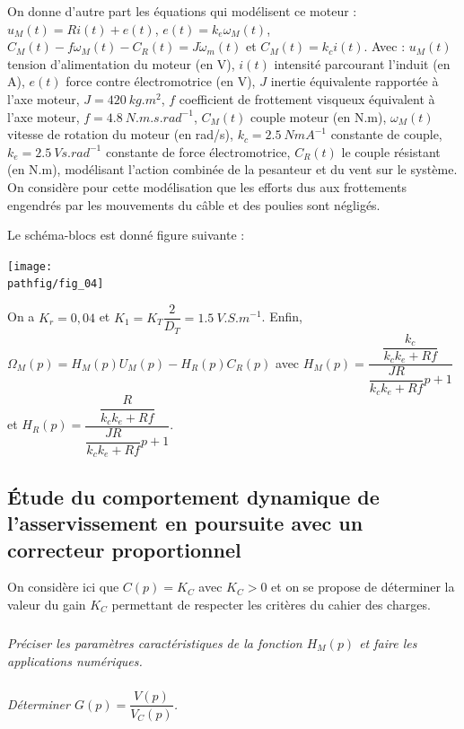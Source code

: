 \documentclass[10pt,fleqn]{article} %
\begin{document}


On donne d’autre part les équations qui modélisent ce moteur : $u_M(t)=R i(t) + e(t)$, 
$e(t) = k_e \omega_M(t)$, 
$C_M (t)-f\omega_M (t)-C_R (t)=J\dot{\omega}_m(t)$ et 
$C_M (t) = k_ c i(t)$. Avec : 
$u_M (t)$ tension d’alimentation du moteur (en V),  $i(t)$ intensité parcourant l’induit (en A), $e(t)$ force contre électromotrice (en V), $J$ inertie équivalente rapportée à l’axe moteur, $J = \SI{420}{kg.m^2}$, $f$ coefficient de frottement visqueux équivalent à l’axe moteur, $f = \SI{4,8}{N.m.s.rad^{-1}}$, $C_M (t)$ couple moteur (en N.m),  $\omega_M(t)$ vitesse de rotation du moteur (en rad/s), $k_c=\SI{2,5}{NmA^{-1}}$ constante de couple, $k_e=\SI{2,5}{Vs.rad^{-1}}$ constante de force électromotrice,  $C_R (t)$ le couple résistant (en N.m), modélisant l’action combinée de la pesanteur et du vent sur le système. On considère pour cette modélisation que les efforts dus aux frottements engendrés par les mouvements du câble et des poulies sont négligés.

Le schéma-blocs est donné figure suivante : 

\begin{center}
\texttt{[image: \\pathfig/fig\_04]}
\end{center}

On a $K_r = 0,04$ et $K_1=K_T\dfrac{2}{D_T}=\SI{1,5}{V.S.m^{-1}}$.
Enfin, $\Omega_M(p)=H_M(p)U_M(p)-H_R(p)C_R(p)$ avec $H_M(p)=\dfrac{\dfrac{k_c}{k_ck_e+Rf}}{\dfrac{JR}{k_ck_e+Rf}p+1}$ et $H_R(p)=\dfrac{\dfrac{R}{k_ck_e+Rf}}{\dfrac{JR}{k_ck_e+Rf}p+1}$.

\subsection*{Étude du comportement dynamique de l’asservissement en poursuite avec un correcteur proportionnel }
On considère ici que $C(p) = K_C$ avec $K_C > $0 et on se propose de déterminer la valeur du gain $K_C$ permettant de respecter les critères du cahier des charges. 

\subparagraph{}\textit{Préciser les paramètres caractéristiques de la fonction $H_M (p)$ et faire les applications numériques.}
\subparagraph{}\textit{Déterminer $G(p)=\dfrac{V(p)}{V_C(p)}$.}
\end{document}
